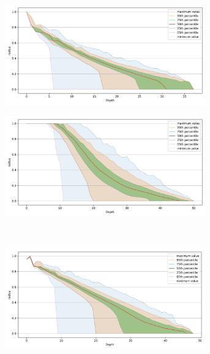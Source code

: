 \begin{figure}[ht!]
    \begin{subfigure}[b]{0.47\textwidth}
    \includegraphics[width=0.95\textwidth]{images/radius/fashion-mnist-60000.png}\\
    \label{fig:results:fashion-mnist-radius}
    \end{subfigure}%
    \begin{subfigure}[b]{0.47\textwidth}
    \includegraphics[width=0.95\textwidth]{images/radius/glove-25-1183514.png}\\
    \label{fig:results:glove-25-radius}
    \end{subfigure}
    \vspace{1em}
    \\
    \begin{subfigure}[b]{0.47\textwidth}
    \includegraphics[width=0.95\textwidth]{images/radius/sift-1000000.png}\\

\end{subfigure}
\end{figure}
